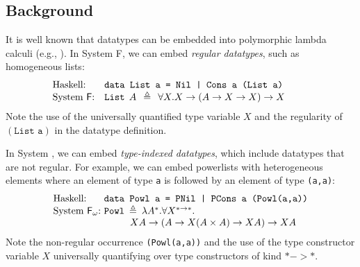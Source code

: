 \subsection{Background}

It is well known that datatypes can be embedded into polymorphic lambda calculi
(e.g., \cite{AbeMatUus03}).  In System \textsf{F}, we can embed \emph{regular datatypes},
such as homogeneous lists:
\[\!\!\!\!\!\!\!\!\!
\begin{array}{ll}
\text{Haskell:} & \texttt{data List a = Nil | Cons a (List a)} \\
\text{System \textsf{F}:} & \texttt{{List}}\:\: A\:\:\triangleq\:\:\forall X.X\to(A\to X\to X)\to X ~~\;
\end{array}
\]
Note the use of the universally quantified type variable $X$
and the regularity of $(\texttt{List a})$ in the datatype definition.

In System \Fw, we can embed \emph{type-indexed datatypes}, which include
datatypes that are not regular. For example, we can embed powerlists with
heterogeneous elements where an element of type \texttt{a} is followed by
an element of type \texttt{(a,a)}:
\[
\begin{array}{ll}
\text{Haskell:} & \!\!\!\!\texttt{data Powl a = PNil | PCons a (Powl(a,a))} \\
\text{System \Fw:} & \!\!\!\!\texttt{{Powl}}\:\triangleq\:
\lambda A^{*}.\forall X^{*\to*}.\\ \qquad
& \qquad X A\to (A\to X(A\times A)\to X A)\to XA
\end{array}
\]
Note the non-regular occurrence \texttt{(Powl(a,a))} and
the use of the type constructor variable $X$ universally quantifying over
type constructors of kind $* -> *$.

